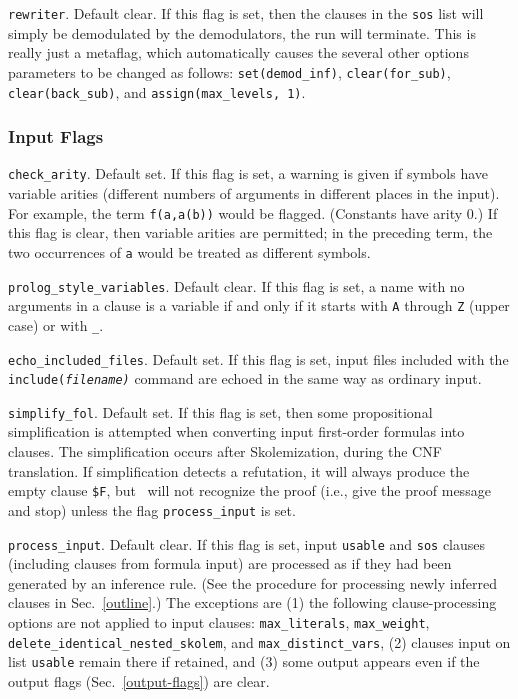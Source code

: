 \documentclass[11pt]{article}
\begin{document}
\noindent
\verb:rewriter:.  Default clear.  If this flag is set, then the clauses
in the \verb:sos: list will simply be demodulated by the demodulators,
the run will terminate.  This is really just a metaflag, which
automatically causes the several other options parameters to be changed
as follows:
\verb:set(demod_inf):,
\verb:clear(for_sub):,
\verb:clear(back_sub):, and
\verb:assign(max_levels, 1):.

\subsubsection{Input Flags}

\verb:check_arity:.  Default set.  If this flag is set, 
a warning is given if symbols
have variable arities (different numbers of arguments in different
places in the input).  For example, the term \verb:f(a,a(b)): would
be flagged.  (Constants have arity 0.)  If this flag is clear, then
variable arities are permitted; in the preceding term, the two
occurrences of \verb:a: would be treated as different symbols.

\noindent
\verb:prolog_style_variables:.  Default clear.  If this flag is
set, a name with no arguments in a clause is a variable if and only if
it starts with \verb:A: through \verb:Z: (upper case) or with \verb:_:.

\noindent
\verb:echo_included_files:.  Default set.  If this flag is
set, input files included with the {\tt include(\it filename\tt )}
command are echoed in the same way as ordinary input.  

\noindent
\verb:simplify_fol:.  Default set.  If this flag is set, then
some propositional simplification is attempted when converting input
first-order formulas into clauses.  The simplification occurs after
Skolemization, during the CNF translation.  If simplification
detects a refutation, it will always produce the empty clause \verb:$F:,
but \otter\ will not recognize the proof (i.e., give the proof
message and stop) unless the flag \verb:process_input: is set.

\noindent
\verb:process_input:.  Default clear.  If this flag is set, input
\verb:usable: and \verb:sos: clauses (including clauses from formula
input) are processed as if they had been generated by an inference rule.
(See the procedure for processing newly
inferred clauses in Sec.~\ref{outline}.)  The exceptions are
(1) the following clause-processing options are not applied
to input clauses: \verb:max_literals:, \verb:max_weight:,
\verb:delete_identical_nested_skolem:, and \verb:max_distinct_vars:,
(2) clauses input on list {\tt usable} remain there if retained, and
(3) some output appears even if the output flags
(Sec.~\ref{output-flags}) are clear.
\end{document}
